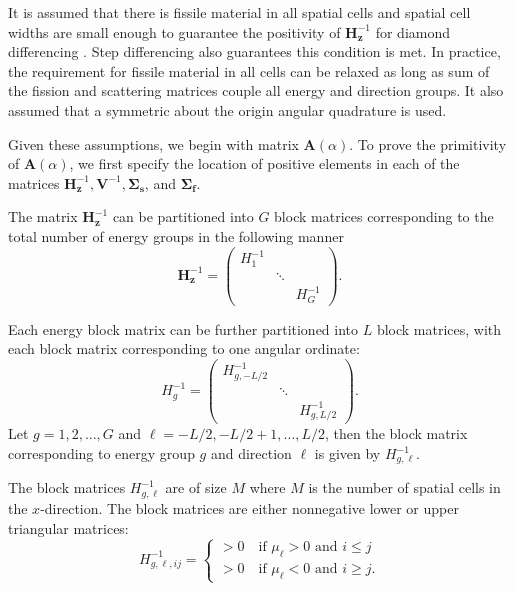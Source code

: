 It is assumed that there is fissile material in all spatial cells and spatial cell widths are small enough to guarantee the positivity of $\mathbf{H}_{\mathbf{z}}^{-1}$ for diamond differencing \cite{greenbaum_iterative_1997}. Step differencing also guarantees this condition is met. In practice, the requirement for fissile material in all cells can be relaxed as long as sum of the fission and scattering matrices couple all energy and direction groups. It also assumed that a symmetric about the origin angular quadrature is used.

Given these assumptions, we begin with matrix $\mathbf{A}(\alpha)$. To prove the primitivity of $\mathbf{A}(\alpha)$, we first specify the location of positive elements in each of the matrices $\mathbf{H}_{\mathbf{z}}^{-1}, \mathbf{V}^{-1}, \mathbf{\Sigma_{s}}$, and $\mathbf{\Sigma_{f}}$.

The matrix $\mathbf{H}_\mathbf{z}^{-1}$ can be partitioned into $G$ block matrices corresponding to the total number of energy groups in the following manner
\begin{equation}
	\mathbf{H}_{\mathbf{z}}^{-1} = \begin{pmatrix}
						H_{1}^{-1} & & \\
						& \ddots & \\
						& & H_{G}^{-1} 
					\end{pmatrix}.
\end{equation}

Each energy block matrix can be further partitioned into $L$ block matrices, with each block matrix corresponding to one angular ordinate:
\begin{equation}
	H_{g}^{-1} = \begin{pmatrix}
						H_{g,-L/2}^{-1} & & \\
						& \ddots & \\
						& & H_{g,L/2}^{-1} 
					\end{pmatrix}.
\end{equation}
Let $g = 1, 2, \dots, G$ and $\ell = -L/2, -L/2+1, \dots, L/2$, then the block matrix corresponding to energy group $g$ and direction $\ell$ is given by $H^{-1}_{g,\ell}$.

The block matrices $H^{-1}_{g,\ell}$ are of size $M$ where $M$ is the number of spatial cells in the $x$-direction. The block matrices are either nonnegative lower or upper triangular matrices:
\begin{equation}
	H^{-1}_{g,\ell,ij} = \begin{cases}
					> 0 \quad \text{if } \mu_{\ell} > 0 \text{ and } i \leq j \\
					> 0 \quad \text{if } \mu_{\ell} < 0 \text{ and } i \geq j.
				\end{cases}
\end{equation}

